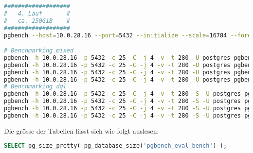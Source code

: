 \begin{flushleft}
\begin{lstlisting}[language=bash, caption=Patroni - Benchmarking-Commands,captionpos=b,label={lst:patroni-benchmarking-commands},breaklines=true]
###################
#   4. Lauf       #
#   ca. 250GiB    #
###################
pgbench --host=10.0.28.16 --port=5432 --initialize --scale=16784 --foreign-keys --fillfactor=100 --username=dtgvpf --index-tablespace=eval_index_tablespace --tablespace=eval_data_tablespace --username=postgres pgbench_eval_bench

# Benchmarking mixed
pgbench -h 10.0.28.16 -p 5432 -c 25 -C -j 4 -v -t 280 -U postgres pgbench_eval_bench > /home/itgramic/4_1_patroni_mixed_benchmark.txt
pgbench -h 10.0.28.16 -p 5432 -c 25 -C -j 4 -v -t 280 -U postgres pgbench_eval_bench > /home/itgramic/4_2_patroni_mixed_benchmark.txt
pgbench -h 10.0.28.16 -p 5432 -c 25 -C -j 4 -v -t 280 -U postgres pgbench_eval_bench > /home/itgramic/4_3_patroni_mixed_benchmark.txt
pgbench -h 10.0.28.16 -p 5432 -c 25 -C -j 4 -v -t 280 -U postgres pgbench_eval_bench > /home/itgramic/4_4_patroni_mixed_benchmark.txt
# Benchmarking dql
pgbench -h 10.0.28.16 -p 5432 -c 25 -C -j 4 -v -t 280 -S -U postgres pgbench_eval_bench > /home/itgramic/4_1_patroni_dql_benchmark.txt
pgbench -h 10.0.28.16 -p 5432 -c 25 -C -j 4 -v -t 280 -S -U postgres pgbench_eval_bench > /home/itgramic/4_2_patroni_dql_benchmark.txt
pgbench -h 10.0.28.16 -p 5432 -c 25 -C -j 4 -v -t 280 -S -U postgres pgbench_eval_bench > /home/itgramic/4_3_patroni_dql_benchmark.txt
pgbench -h 10.0.28.16 -p 5432 -c 25 -C -j 4 -v -t 280 -S -U postgres pgbench_eval_bench > /home/itgramic/4_4_patroni_dql_benchmark.txt
\end{lstlisting}
\end{flushleft}
\begin{flushleft}
    Die grösse der Tabellen lässt sich wie folgt auslesen:
\lstset{style=gra_codestyle}
\begin{lstlisting}[language=sql, caption=Patroni - Benchmarking - Table Size SQL,captionpos=b,label={lst:patroni-benchmarking-table-size-sql},breaklines=true]
SELECT pg_size_pretty( pg_database_size('pgbench_eval_bench') );
\end{lstlisting}
\end{flushleft}